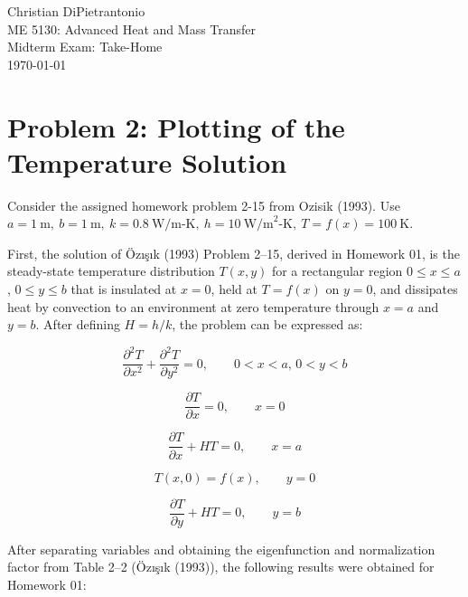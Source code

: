 \documentclass[letterpaper,12pt]{article}
\begin{document}
Christian DiPietrantonio \\
ME 5130: Advanced Heat and Mass Transfer \\
Midterm Exam: Take-Home \\
\today

\vspace{6pt}

\section*{Problem 2: Plotting of the Temperature Solution}

Consider the assigned homework problem 2-15 from Ozisik (1993). Use $ a = 1~\text{m}, \: b = 1~\text{m}, \: k = 0.8~\text{W/m-K}, \: h = 10~\text{W/m}^2\text{-K}, \: T = f(x) = 100~\text{K}.$

\vspace{6pt}

First, the solution of \"Oz\i \c{s}\i k (1993) Problem 2--15, derived in Homework 01, is the steady-state temperature distribution $T(x,y)$ for a rectangular region $0 \leq x \leq a$, $0 \leq y \leq b$ that is insulated at $x = 0$, held at $T = f(x)$ on $y = 0$, and dissipates heat by convection to an environment at zero temperature through $x = a$ and $y = b$. After defining $H = h/k$, the problem can be expressed as:

\begin{equation}
    \frac{\partial^2 T}{\partial x^2} + \frac{\partial^2 T}{\partial y^2} = 0, \qquad 0 < x < a, \, 0 < y < b
\end{equation}

\begin{equation}
    \frac{\partial T}{\partial x} = 0, \qquad x = 0
\end{equation}

\begin{equation}
    \frac{\partial T}{\partial x} + HT = 0, \qquad x = a
\end{equation}

\begin{equation}
    T(x, 0) = f(x), \qquad y = 0
\end{equation}

\begin{equation}
    \frac{\partial T}{\partial y} + HT = 0, \qquad y = b
\end{equation}

After separating variables and obtaining the eigenfunction and normalization factor from Table 2--2 (\"Oz\i \c{s}\i k (1993)), the following results were obtained for Homework 01:
\end{document}

